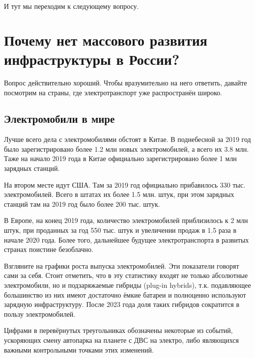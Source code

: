 \documentclass[a4paper,12pt]{report}
\begin{document}
И тут мы переходим к следующему вопросу.



\chapter{Почему нет массового развития инфраструктуры в России?}
Вопрос действительно хороший. Чтобы вразумительно на него ответить, давайте посмотрим на страны, где электротранспорт уже распространён широко. 

\section{Электромобили в мире}
Лучше всего дела с электромобилями обстоят в Китае. В поднебесной за 2019 год было зарегистрировано более 1.2 млн новых электромобилей, а всего их 3.8 млн. Таже на начало 2019 года в Китае официально зарегистрировано более 1 млн зарядных станций.

На втором месте идут США. Там за 2019 год официально прибавилось 330 тыс. электромобилей. Всего в штатах их более 1.5 млн. штук, при этом зарядных станций там на 2019 год было более 200 тыс. штук.

В Европе, на конец 2019 года, количество электромобилей приблизилось к 2 млн штук, при проданных за год 550 тыс. штук и увеличении продаж в 1.5 раза в начале 2020 года.
Более того, дальнейшее будущее электротранспорта в развитых странах поистине безоблачно. 

Взгляните на графики роста выпуска электромобилей. Эти показатели говорят сами за себя. Стоит отметить, что в эту статистику входят не только абсолютные электромобили, но и подзаряжаемые гибриды (plug-in hybrids), т.к. подавляющее большинство из них имеют достаточно ёмкие батареи и полноценно используют зарядную инфраструктуру.
После 2023 года доля таких гибридов сократится в пользу электромобилей.

Цифрами в перевёрнутых треугольниках обозначены некоторые из событий, ускоряющих смену автопарка на планете с ДВС на электро, либо являющихся важными контрольными точками этих изменений.
\end{document}
